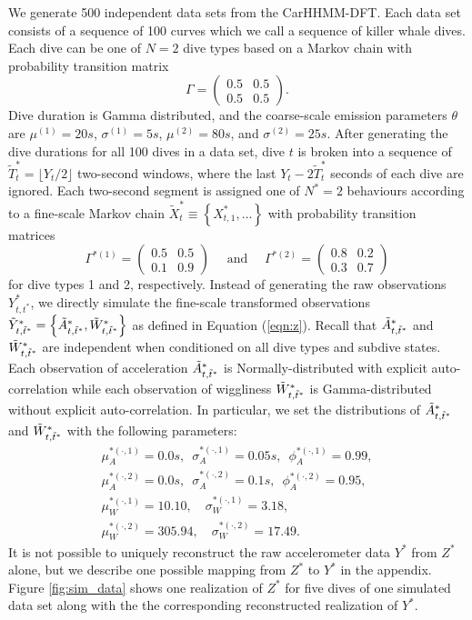 We generate 500 independent data sets from the CarHHMM-DFT. Each data set consists of a sequence of 100 curves which we call a sequence of killer whale dives. Each dive can be one of $N=2$ dive types based on a Markov chain with probability transition matrix
%
$$\Gamma = \begin{pmatrix} 0.5 & 0.5 \\ 0.5 & 0.5 \end{pmatrix}.$$
%
Dive duration is Gamma distributed, and the coarse-scale emission parameters $\theta$ are $\mu^{(1)} = 20s$, $\sigma^{(1)} = 5s$, $\mu^{(2)} = 80s$, and $\sigma^{(2)} = 25s$. After generating the dive durations for all 100 dives in a data set, dive $t$ is broken into a sequence of $\tilde T^*_t = \lfloor Y_t/2 \rfloor$ two-second windows, where the last $Y_t - 2 \tilde T^*_t$ seconds of each dive are ignored. Each two-second segment is assigned one of $N^*=2$ behaviours according to a fine-scale Markov chain $\tilde X^*_t \equiv \left\{X^*_{t,1}, \ldots \right\}$ with probability transition matrices
%
$$\Gamma^{*(1)} = \begin{pmatrix} 0.5 & 0.5 \\ 0.1 & 0.9 \end{pmatrix} \quad \text{ and } \quad \Gamma^{*(2)} = \begin{pmatrix} 0.8 & 0.2 \\ 0.3 & 0.7 \end{pmatrix}$$ 
%
for dive types 1 and 2, respectively.
Instead of generating the raw observations $Y^*_{t,t^*}$, we directly simulate the fine-scale transformed observations $\tilde{Y}^*_{t,\tilde t^*} = \left\{\tilde{A}^*_{t,\tilde t^*}, \tilde{W}^*_{t,\tilde t^*}\right\}$ as defined in Equation (\ref{eqn:z}). Recall that $\tilde{A}^*_{t,\tilde t^*}$ and $\tilde{W}^*_{t,\tilde t^*}$ are independent when conditioned on all dive types and subdive states. Each observation of acceleration $\tilde{A}^*_{t,\tilde t^*}$ is Normally-distributed with explicit auto-correlation while each observation of wiggliness $\tilde{W}^*_{t,\tilde t^*}$ is Gamma-distributed without explicit auto-correlation. In particular, we set the distributions of $\tilde{A}^*_{t,\tilde t^*}$ and $\tilde{W}^*_{t,\tilde t^*}$ with the following parameters:
%
\begin{gather*}
    \mu_A^{*(\cdot,1)} = 0.0 s, \enspace \sigma_A^{*(\cdot,1)} = 0.05s, \enspace \phi_A^{*(\cdot,1)} = 0.99, \\
    \mu_A^{*(\cdot,2)} = 0.0 s, \enspace \sigma_A^{*(\cdot,2)} = 0.1s, \enspace \phi_A^{*(\cdot,2)} = 0.95, \\
    \mu_W^{*(\cdot,1)} = 10.10, \quad \sigma_W^{*(\cdot,1)} = 3.18, \\
    \mu_W^{*(\cdot,2)} = 305.94, \quad \sigma_W^{*(\cdot,2)} = 17.49.
\end{gather*}
%
It is not possible to uniquely reconstruct the raw accelerometer data $Y^*$ from $Z^*$ alone, but we describe one possible mapping from $Z^*$ to $Y^*$ in the appendix. Figure \ref{fig:sim_data} shows one realization of $Z^*$ for five dives of one simulated data set along with the the corresponding reconstructed realization of $Y^*$. 

